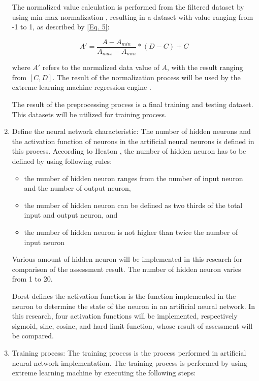 \documentclass[journal,comsoc]{IEEEtran}
\begin{document}
\begin{enumerate}
The normalized value calculation is performed from the filtered dataset by using min-max normalization \cite{Patro15} , resulting in a dataset with value ranging from -1 to 1, as described by \eqref{Eq. 5}:

\begin{equation}
A' = \frac{A - A_{min}}{A_{max} - A_{min}} * (D - C) + C\label{Eq. 5}
\end{equation}

where $A'$ refers to the normalized data value of $A$, with the result ranging from $[C, D]$. The result of the normalization process will be used by the extreme learning machine regression engine \cite{Zhu13}.

The result of the preprocessing process is a final training and testing dataset. This datasets will be utilized for training process.

\item Define the neural network characteristic: The number of hidden neurons and the activation function of neurons in the artificial neural neurons is defined in this process. According to Heaton \cite{Heaton08} , the number of hidden neuron has to be defined by using following rules:

\begin{itemize}
\item the number of hidden neuron ranges from the number of input neuron and the number of output neuron,
\item the number of hidden neuron can be defined as two thirds of the total input and output neuron, and
\item the number of hidden neuron is not higher than twice the number of input neuron
\end{itemize}

Various amount of hidden neuron will be implemented in this research for comparison of the assessment result. The number of hidden neuron varies from 1 to 20.

Dorst \cite{Dorst16} defines the activation function is the function implemented in the neuron to determine the state of the neuron in an artificial neural network. In this research, four activation functions will be implemented, respectively sigmoid, sine, cosine, and hard limit function, whose result of assessment will be compared.

\item Training process: The training process is the process performed in artificial neural network implementation. The training process is performed by using extreme learning machine by executing the following steps:


\end{enumerate}
\end{document}
